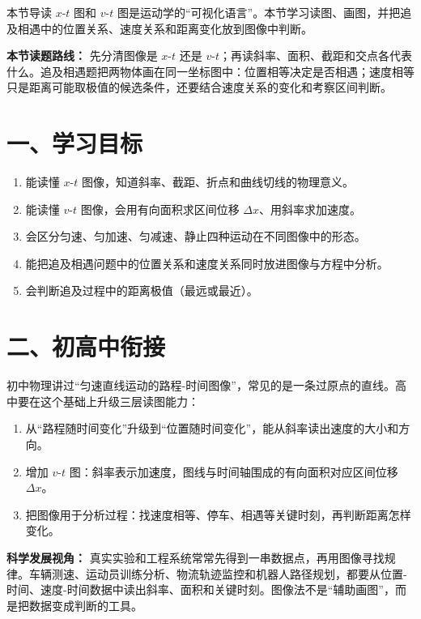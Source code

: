 
\begin{learningbox}{本节导读}
$x$-$t$ 图和 $v$-$t$ 图是运动学的“可视化语言”。本节学习读图、画图，并把追及相遇中的位置关系、速度关系和距离变化放到图像中判断。
\end{learningbox}

\textbf{本节读题路线：} 先分清图像是 $x$-$t$ 还是 $v$-$t$；再读斜率、面积、截距和交点各代表什么。追及相遇题把两物体画在同一坐标图中：位置相等决定是否相遇；速度相等只是距离可能取极值的候选条件，还要结合速度关系的变化和考察区间判断。

\section*{一、学习目标}

\begin{enumerate}
  \item 能读懂 $x$-$t$ 图像，知道斜率、截距、折点和曲线切线的物理意义。
  \item 能读懂 $v$-$t$ 图像，会用有向面积求区间位移 $\Delta x$、用斜率求加速度。
  \item 会区分匀速、匀加速、匀减速、静止四种运动在不同图像中的形态。
  \item 能把追及相遇问题中的位置关系和速度关系同时放进图像与方程中分析。
  \item 会判断追及过程中的距离极值（最远或最近）。
\end{enumerate}

\section*{二、初高中衔接}

初中物理讲过“匀速直线运动的路程-时间图像”，常见的是一条过原点的直线。高中要在这个基础上升级三层读图能力：

\begin{enumerate}
  \item 从“路程随时间变化”升级到“位置随时间变化”，能从斜率读出速度的大小和方向。
  \item 增加 $v$-$t$ 图：斜率表示加速度，图线与时间轴围成的有向面积对应区间位移 $\Delta x$。
  \item 把图像用于分析过程：找速度相等、停车、相遇等关键时刻，再判断距离怎样变化。
\end{enumerate}

\textbf{科学发展视角：} 真实实验和工程系统常常先得到一串数据点，再用图像寻找规律。车辆测速、运动员训练分析、物流轨迹监控和机器人路径规划，都要从位置-时间、速度-时间数据中读出斜率、面积和关键时刻。图像法不是“辅助画图”，而是把数据变成判断的工具。

